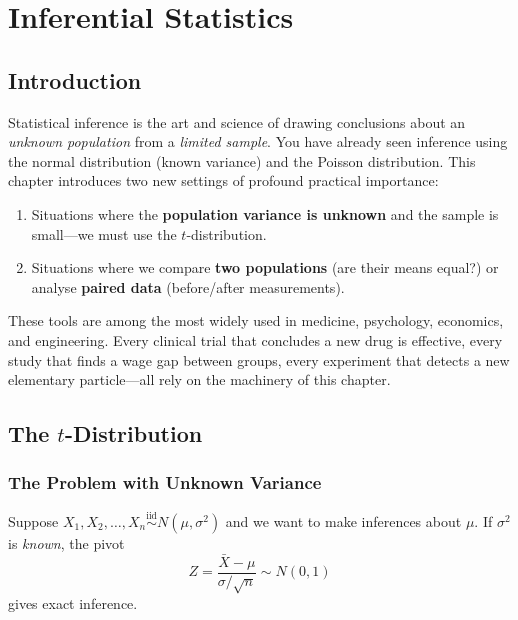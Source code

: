 \documentclass[12pt, a4paper, oneside]{book}
\theoremstyle{definition}
\theoremstyle{plain}
\theoremstyle{remark}
\newcommand{\iid}{\overset{\text{iid}}{\sim}}
\begin{document}
\chapter{Inferential Statistics}
\label{ch:infer}

\section{Introduction}

Statistical inference is the art and science of drawing conclusions about an
\emph{unknown population} from a \emph{limited sample}.  You have already
seen inference using the normal distribution (known variance) and the Poisson
distribution.  This chapter introduces two new settings of profound practical
importance:

\begin{enumerate}
  \item Situations where the \textbf{population variance is unknown} and
        the sample is small---we must use the $t$-distribution.
  \item Situations where we compare \textbf{two populations} (are their
        means equal?) or analyse \textbf{paired data} (before/after measurements).
\end{enumerate}

These tools are among the most widely used in medicine, psychology,
economics, and engineering.  Every clinical trial that concludes a new drug
is effective, every study that finds a wage gap between groups, every
experiment that detects a new elementary particle---all rely on the machinery
of this chapter.

\section{The $t$-Distribution}
\label{sec:tdist}

\subsection{The Problem with Unknown Variance}

Suppose $X_1,X_2,\ldots,X_n \iid N(\mu,\sigma^2)$ and we want to make
inferences about $\mu$.  If $\sigma^2$ is \emph{known}, the pivot
\[
  Z = \frac{\bar{X} - \mu}{\sigma/\sqrt{n}} \sim N(0,1)
\]
gives exact inference.
\end{document}
